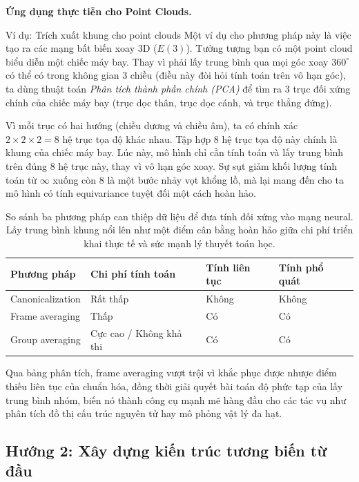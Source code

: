 \textbf{Ứng dụng thực tiễn cho Point Clouds.}

\begin{examplebox}{Ví dụ: Trích xuất khung cho point clouds}
Một ví dụ cho phương pháp này là việc tạo ra các mạng bất biến xoay 3D ($E(3)$). Tưởng tượng bạn có một point cloud biểu diễn một chiếc máy bay. Thay vì phải lấy trung bình qua mọi góc xoay $360^\circ$ có thể có trong không gian 3 chiều (điều này đòi hỏi tính toán trên vô hạn góc), ta dùng thuật toán \textit{Phân tích thành phần chính (PCA)} để tìm ra 3 trục đối xứng chính của chiếc máy bay (trục dọc thân, trục dọc cánh, và trục thẳng đứng). 

Vì mỗi trục có hai hướng (chiều dương và chiều âm), ta có chính xác $2 \times 2 \times 2 = 8$ hệ trục tọa độ khác nhau. Tập hợp 8 hệ trục tọa độ này chính là khung của chiếc máy bay. Lúc này, mô hình chỉ cần tính toán và lấy trung bình trên đúng $8$ hệ trục này, thay vì vô hạn góc xoay. Sự sụt giảm khối lượng tính toán từ $\infty$ xuống còn $8$ là một bước nhảy vọt khổng lồ, mà lại mang đến cho ta mô hình có tính equivariance tuyệt đối một cách hoàn hảo.
\end{examplebox}


\begin{table}[H]
\centering
\small
\begin{tabular}{p{}p{}p{}p{}}
\toprule
\textbf{Phương pháp} & \textbf{Chi phí tính toán} & \textbf{Tính liên tục} & \textbf{Tính phổ quát} \\
\midrule
Canonicalization & Rất thấp & Không & Không \\
Frame averaging & Thấp & Có & Có \\
Group averaging & Cực cao / Không khả thi & Có & Có \\
\bottomrule
\end{tabular}
\caption{So sánh ba phương pháp can thiệp dữ liệu để đưa tính đối xứng vào mạng neural. Lấy trung bình khung nổi lên như một điểm cân bằng hoàn hảo giữa chi phí triển khai thực tế và sức mạnh lý thuyết toán học.}
\label{tab:symmetrization-compare}
\end{table}

Qua bảng phân tích, frame averaging vượt trội vì khắc phục được nhược điểm thiếu liên tục của chuẩn hóa, đồng thời giải quyết bài toán độ phức tạp của lấy trung bình nhóm, biến nó thành công cụ mạnh mẽ hàng đầu cho các tác vụ như phân tích đồ thị cấu trúc nguyên tử hay mô phỏng vật lý đa hạt.


\subsection{Hướng 2: Xây dựng kiến trúc tương biến từ đầu}
\label{subsec:constructed}


